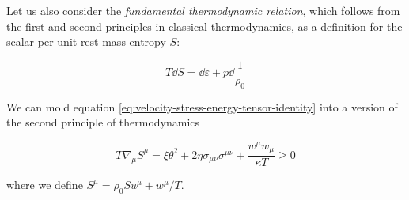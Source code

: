 \documentclass[main.tex]{subfiles}
\begin{document}
Let us also consider the \emph{fundamental thermodynamic relation}, which follows from the first and second principles in classical thermodynamics, as a definition for the scalar per-unit-rest-mass entropy \(S\):

\begin{equation} \label{eq:differential-entropy}
    T\dd{S} = \dd{\varepsilon} + p \dd{\frac{1}{\rho_0}}
\end{equation}

\begin{claim}
    We can mold equation \eqref{eq:velocity-stress-energy-tensor-identity} into a version of the second principle of thermodynamics

    \begin{equation} \label{eq:second-principle-thermodynamics}
        T \nabla_\mu S^\mu = \xi \theta^2 + 2 \eta \sigma_{\mu\nu} \sigma^{\mu\nu} + \frac{w^\mu w_\mu}{\kappa T} \geq 0
    \end{equation}

    where we define \(S^\mu = \rho_0 S u^\mu + w^\mu /T\).
\end{claim}
\end{document}
